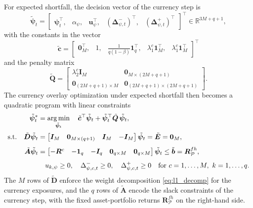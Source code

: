 For expected shortfall, the decision vector of the currency step is
\begin{equation*}
    \tilde{\bm{\psi}}_t = \begin{bmatrix} \bm{\psi}_t^\top,& \alpha_\psi,& \bm{u}_\psi^\top,&
    (\bm{\Delta}_{\psi,t}^-)^\top,& (\bm{\Delta}_{\psi,t}^+)^\top \end{bmatrix}^\top \in \mathbb{R}^{3M+q+1},
\end{equation*}
with the constants in the vector
\begin{equation*}
    \tilde{\bm{c}} = \begin{bmatrix} \bm{0}_M^\top,& 1,& \tfrac{1}{q(1-\beta)} \bm{1}_q^\top,& \lambda_1^c \bm{1}_M^\top,& \lambda_1^c \bm{1}_M^\top \end{bmatrix}^\top
\end{equation*}
and the penalty matrix
\begin{equation*}
    \tilde{\bm{Q}} =
    \begin{bmatrix}
        \lambda_2^c \bm{I}_M & \bm{0}_{M \times (2M+q+1)} \\
        \bm{0}_{(2M+q+1) \times M} & \bm{0}_{(2M+q+1) \times (2M+q+1)}
    \end{bmatrix}.
\end{equation*}
The currency overlay optimization under expected shortfall then becomes a quadratic program with linear constraints
\begin{equation} \label{eq:sep_curr_qp}
\begin{aligned}
    \tilde{\bm{\psi}}_t^* &= \operatorname*{arg\,min}_{\tilde{\bm{\psi}}_t} \quad
     \tilde{\bm{c}}^\top \tilde{\bm{\psi}}_t + \tilde{\bm{\psi}}_t^\top \tilde{\bm{Q}}\, \tilde{\bm{\psi}}_t, \\[2pt]
    \text{s.t.} \quad
    \tilde{\bm{D}} \tilde{\bm{\psi}}_t &=
    \begin{bmatrix} \bm{I}_M & \bm{0}_{M \times (q+1)} & \bm{I}_M & -\bm{I}_M \end{bmatrix} \tilde{\bm{\psi}}_t
    = \tilde{\bm{E}} = \bm{0}_M, \\[4pt]
    \tilde{\bm{A}} \tilde{\bm{\psi}}_t &=
    \begin{bmatrix} -\bm{R}^c & -\bm{1}_q & -\bm{I}_q & \bm{0}_{q \times M} & \bm{0}_{q \times M} \end{bmatrix}
    \tilde{\bm{\psi}}_t \le \tilde{\bm{b}} = \bm{R}^{fh}_{\mathcal{P}}, \\[4pt]
    & \quad u_{k,\psi} \ge 0,\quad \Delta_{\psi,c,t}^- \ge 0,\quad \Delta_{\psi,c,t}^+ \ge 0
    \quad \text{for } c = 1, \dots, M,\ k = 1, \dots, q.
\end{aligned}
\end{equation}
The $M$ rows of $\tilde{\bm{D}}$ enforce the weight decomposition \eqref{eq:l1_decomp} for the currency exposures,
and the $q$ rows of $\tilde{\bm{A}}$ encode the slack constraints of the currency step, with the fixed
asset-portfolio returns $\bm{R}^{fh}_{\mathcal{P}}$ on the right-hand side.

